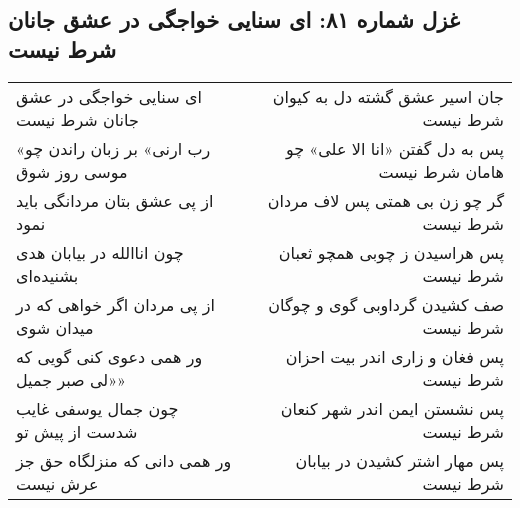 \begin{center}
\section*{غزل شماره ۸۱: ای سنایی خواجگی در عشق جانان شرط نیست}
\label{sec:081}
\begin{longtable}{l p{0.5cm} r}
ای سنایی خواجگی در عشق جانان شرط نیست
&&
جان اسیر عشق گشته دل به کیوان شرط نیست
\\
«رب ارنی» بر زبان راندن چو موسی روز شوق
&&
پس به دل گفتن «انا الا علی» چو هامان شرط نیست
\\
از پی عشق بتان مردانگی باید نمود
&&
گر چو زن بی همتی پس لاف مردان شرط نیست
\\
چون اناالله در بیابان هدی بشنیده‌ای
&&
پس هراسیدن ز چوبی همچو ثعبان شرط نیست
\\
از پی مردان اگر خواهی که در میدان شوی
&&
صف کشیدن گرداوبی گوی و چوگان شرط نیست
\\
ور همی دعوی کنی گویی که «لی صبر جمیل»
&&
پس فغان و زاری اندر بیت احزان شرط نیست
\\
چون جمال یوسفی غایب شدست از پیش تو
&&
پس نشستن ایمن اندر شهر کنعان شرط نیست
\\
ور همی دانی که منزلگاه حق جز عرش نیست
&&
پس مهار اشتر کشیدن در بیابان شرط نیست
\\
\end{longtable}
\end{center}
